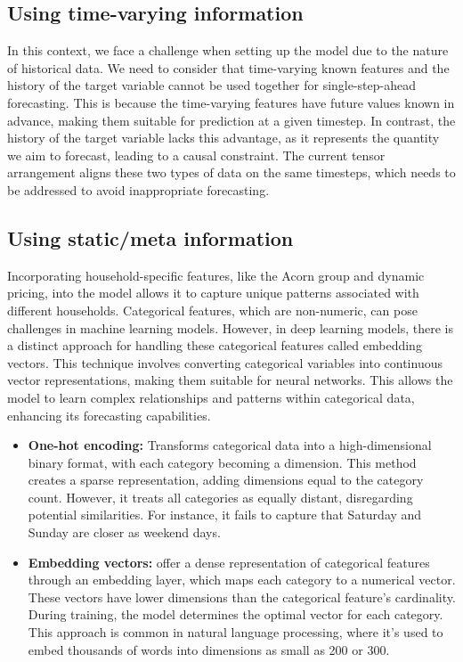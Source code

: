 \documentclass{article}
\begin{document}
\subsection{Using time-varying information}
In this context, we face a challenge when setting up the model due to the nature of historical data. We need to consider that time-varying known features and the history of the target variable cannot be used together for single-step-ahead forecasting. This is because the time-varying features have future values known in advance, making them suitable for prediction at a given timestep. In contrast, the history of the target variable lacks this advantage, as it represents the quantity we aim to forecast, leading to a causal constraint. The current tensor arrangement aligns these two types of data on the same timesteps, which needs to be addressed to avoid inappropriate forecasting.



\subsection{Using static/meta information}

Incorporating household-specific features, like the Acorn group and dynamic pricing, into the model allows it to capture unique patterns associated with different households. Categorical features, which are non-numeric, can pose challenges in machine learning models. However, in deep learning models, there is a distinct approach for handling these categorical features called embedding vectors. This technique involves converting categorical variables into continuous vector representations, making them suitable for neural networks. This allows the model to learn complex relationships and patterns within categorical data, enhancing its forecasting capabilities.
\begin{itemize}
    \item \textbf{One-hot encoding: } Transforms categorical data into a high-dimensional binary format, with each category becoming a dimension. This method creates a sparse representation, adding dimensions equal to the category count. However, it treats all categories as equally distant, disregarding potential similarities. For instance, it fails to capture that Saturday and Sunday are closer as weekend days.
    \item \textbf{Embedding vectors: } offer a dense representation of categorical features through an embedding layer, which maps each category to a numerical vector. These vectors have lower dimensions than the categorical feature's cardinality. During training, the model determines the optimal vector for each category. This approach is common in natural language processing, where it's used to embed thousands of words into dimensions as small as 200 or 300.
\end{itemize}
\end{document}
